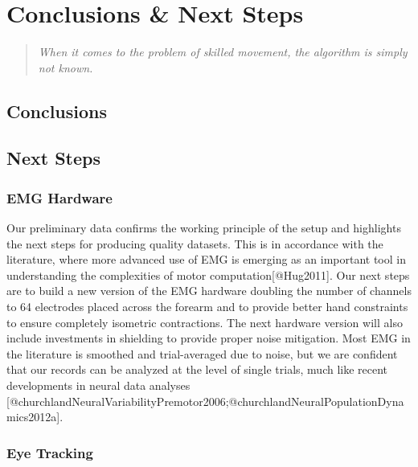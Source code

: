 \documentclass[../main.tex]{subfiles}
\begin{document}
\chapter{Conclusions \& Next Steps}\label{chap:basic_results}


\begin{quote}
    \emph{When it comes to the problem of skilled movement, the algorithm is simply not known.}\\ 
\end{quote}


\cleardoublepage%



\section{Conclusions}\label{sec:conclusion}


\section{Next Steps}\label{sec:next_steps}


\subsection{EMG Hardware}

Our preliminary data confirms the working principle of the setup and highlights the next steps for producing quality datasets. This is in accordance with the literature, where more advanced use of EMG is emerging as an important tool in understanding the complexities of motor computation[@Hug2011]. Our next steps are to build a new version of the EMG hardware doubling the number of channels to 64 electrodes placed across the forearm and to provide better hand constraints to ensure completely isometric contractions. The next hardware version will also include investments in shielding to provide proper noise mitigation. Most EMG in the literature is smoothed and trial-averaged due to noise, but we are confident that our records can be analyzed at the level of single trials, much like recent developments in neural data analyses [@churchlandNeuralVariabilityPremotor2006;@churchlandNeuralPopulationDynamics2012a].

\subsection{Eye Tracking}
\end{document}
